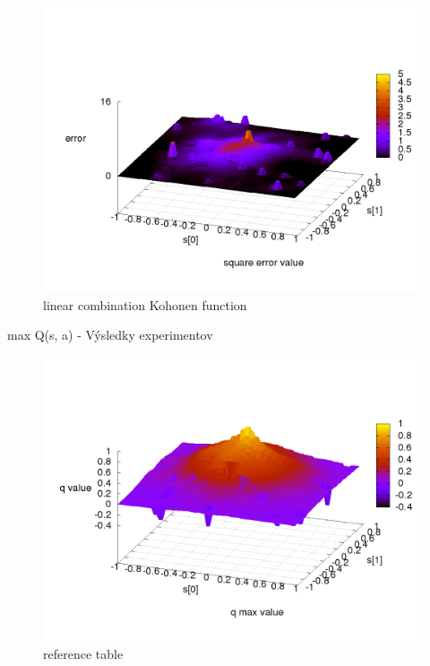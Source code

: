 \begin{figure}[!htb]
\centering
\includegraphics[scale=.4]{../../results_q_learning/map_1/function_type_4/q_learning_error.png}
\caption{linear combination Kohonen function}
\end{figure}






max Q(s, a) - Výsledky experimentov


\begin{figure}[!htb]
\centering
\includegraphics[scale=.4]{../../results_q_learning/map_1/function_type_0/iterations_10/q_learning_result.png}
\caption{reference table}
\end{figure}


